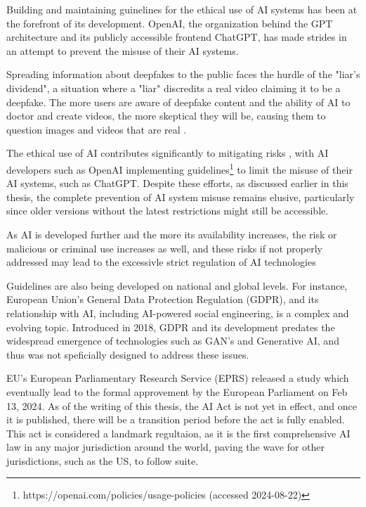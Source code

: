 \begin{comment}    
    - Deepfake content detection
    - Spear phishing detection
\end{comment}

Building and maintaining guinelines for the ethical use of AI systems has been at the forefront of its development. OpenAI, the organization behind the GPT architecture and its publicly accessible frontend ChatGPT, has made strides in an attempt to prevent the misuse of their AI systems.

Spreading information about deepfakes to the public faces the hurdle of the "liar's dividend", a situation where a "liar" discredits a real video claiming it to be a deepfake. The more users are aware of deepfake content and the ability of AI to doctor and create videos, the more skeptical they will be, causing them to question images and videos that are real \citep{blauthArtificialIntelligenceCrimeOverviewMaliciousUseAbuse2022}.

The ethical use of AI contributes significantly to mitigating risks \citep{guptaFromChatGPTtoThreatGPT2023}, with AI developers such as OpenAI implementing guidelines\footnote{https://openai.com/policies/usage-policies (accessed 2024-08-22)} to limit the misuse of their AI systems, such as ChatGPT. Despite these efforts, as discussed earlier in this thesis, the complete prevention of AI system misuse remains elusive, particularly since older versions without the latest restrictions might still be accessible.

As AI is developed further and the more its availability increases, the risk or malicious or criminal use increases as well, and these risks if not properly addressed may lead to the excessivle strict regulation of AI technologies \citep{king_AI_Crime_Interdisciplinary_Analysis_2019}

Guidelines are also being developed on national and global levels. For instance, European Union's General Data Protection Regulation (GDPR), and its relationship with AI, including AI-powered social engineering, is a complex and evolving topic. Introduced in 2018, GDPR and its development predates the widespread emergence of technologies such as GAN's and Generative AI\citep{goodfellowGenerativeAdversarialNetworks2020}, and thus was not speficially designed to address these issues.

EU's European Parliamentary Research Service (EPRS) released a study\citep{eprsTheImpactofTheGDPR2020} which eventually lead to the formal approvement by the European Parliament on Feb 13, 2024. As of the writing of this thesis, the AI Act is not yet in effect, and once it is published, there will be a transition period before the act is fully enabled. This act is considered a landmark regultaion, as it is the first comprehensive AI law in any major jurisdiction around the world, paving the wave for other jurisdictions, such as the US,  to follow suite.

